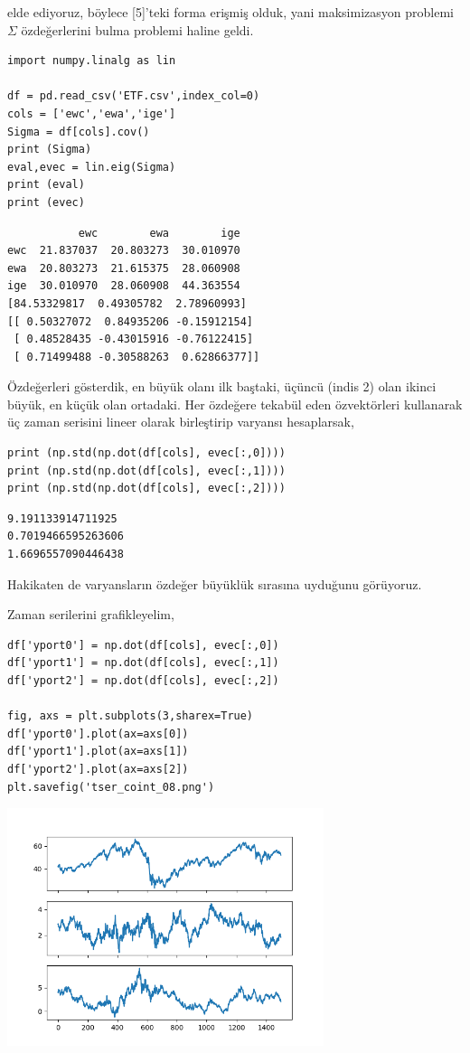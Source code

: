 \documentclass[12pt,fleqn]{article}\usepackage{../../common}
\begin{document}
elde ediyoruz, böylece [5]'teki forma erişmiş olduk, yani maksimizasyon
problemi $\Sigma$ özdeğerlerini bulma problemi haline geldi.

\begin{verbatim}
import numpy.linalg as lin

df = pd.read_csv('ETF.csv',index_col=0)
cols = ['ewc','ewa','ige']
Sigma = df[cols].cov()
print (Sigma)
eval,evec = lin.eig(Sigma)
print (eval)
print (evec)
\end{verbatim}

\begin{verbatim}
           ewc        ewa        ige
ewc  21.837037  20.803273  30.010970
ewa  20.803273  21.615375  28.060908
ige  30.010970  28.060908  44.363554
[84.53329817  0.49305782  2.78960993]
[[ 0.50327072  0.84935206 -0.15912154]
 [ 0.48528435 -0.43015916 -0.76122415]
 [ 0.71499488 -0.30588263  0.62866377]]
\end{verbatim}

Özdeğerleri gösterdik, en büyük olanı ilk baştaki, üçüncü (indis 2) olan ikinci
büyük, en küçük olan ortadaki. Her özdeğere tekabül eden özvektörleri kullanarak
üç zaman serisini lineer olarak birleştirip varyansı hesaplarsak,

\begin{verbatim}
print (np.std(np.dot(df[cols], evec[:,0])))
print (np.std(np.dot(df[cols], evec[:,1])))
print (np.std(np.dot(df[cols], evec[:,2])))
\end{verbatim}

\begin{verbatim}
9.191133914711925
0.7019466595263606
1.6696557090446438
\end{verbatim}

Hakikaten de varyansların özdeğer büyüklük sırasına uyduğunu görüyoruz.

Zaman serilerini grafikleyelim,

\begin{verbatim}
df['yport0'] = np.dot(df[cols], evec[:,0])
df['yport1'] = np.dot(df[cols], evec[:,1])
df['yport2'] = np.dot(df[cols], evec[:,2])

fig, axs = plt.subplots(3,sharex=True)
df['yport0'].plot(ax=axs[0])
df['yport1'].plot(ax=axs[1])
df['yport2'].plot(ax=axs[2])
plt.savefig('tser_coint_08.png')
\end{verbatim}

\includegraphics[width=25em]{tser_coint_08.png}
\end{document}
